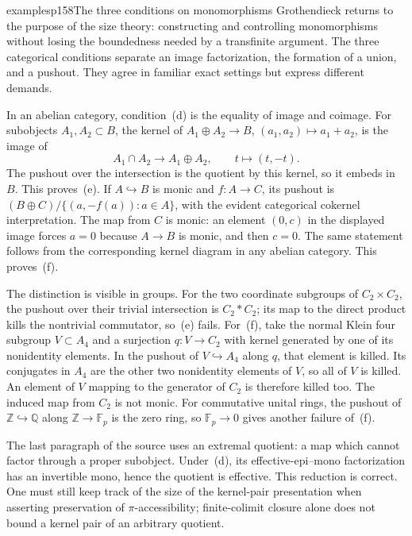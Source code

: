 \begin{dcomment}{examples}{p158}{The three conditions on monomorphisms}
Grothendieck returns to the purpose of the size theory: constructing and controlling monomorphisms without losing the boundedness needed by a transfinite argument. The three categorical conditions separate an image factorization, the formation of a union, and a pushout. They agree in familiar exact settings but express different demands.

In an abelian category, condition~(d) is the equality of image and coimage. For subobjects $A_1,A_2\subset B$, the kernel of $A_1\oplus A_2\to B$, $(a_1,a_2)\mapsto a_1+a_2$, is the image of
\[
 A_1\cap A_2\longrightarrow A_1\oplus A_2,
 \qquad t\longmapsto(t,-t).
\]
The pushout over the intersection is the quotient by this kernel, so it embeds in $B$. This proves~(e). If $A\hookrightarrow B$ is monic and $f:A\to C$, its pushout is
$(B\oplus C)/\{(a,-f(a)):a\in A\}$, with the evident categorical cokernel interpretation. The map from $C$ is monic: an element $(0,c)$ in the displayed image forces $a=0$ because $A\to B$ is monic, and then $c=0$. The same statement follows from the corresponding kernel diagram in any abelian category. This proves~(f).

The distinction is visible in groups. For the two coordinate subgroups of $C_2\times C_2$, the pushout over their trivial intersection is $C_2*C_2$; its map to the direct product kills the nontrivial commutator, so~(e) fails. For~(f), take the normal Klein four subgroup $V\subset A_4$ and a surjection $q:V\to C_2$ with kernel generated by one of its nonidentity elements. In the pushout of $V\hookrightarrow A_4$ along $q$, that element is killed. Its conjugates in $A_4$ are the other two nonidentity elements of $V$, so all of $V$ is killed. An element of $V$ mapping to the generator of $C_2$ is therefore killed too. The induced map from $C_2$ is not monic. For commutative unital rings, the pushout of $\mathbb Z\hookrightarrow\mathbb Q$ along $\mathbb Z\to\mathbb F_p$ is the zero ring, so $\mathbb F_p\to0$ gives another failure of~(f).

The last paragraph of the source uses an extremal quotient: a map which cannot factor through a proper subobject. Under~(d), its effective-epi--mono factorization has an invertible mono, hence the quotient is effective. This reduction is correct. One must still keep track of the size of the kernel-pair presentation when asserting preservation of $\pi$-accessibility; finite-colimit closure alone does not bound a kernel pair of an arbitrary quotient.
\end{dcomment}


